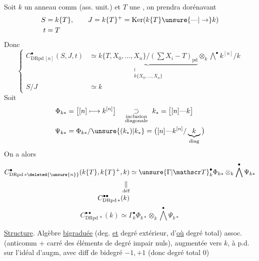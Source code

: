  Soit $k$ un anneau comm (ass. unit.) et $T$ une , on prendra dorénavant
\[
\begin{aligned}
S&=k\{T\},\qquad J=k\{T\}^{+}=\operatorname{Ker}(k\{T\}\unsure{\text{---}|\to} k)\\
t&=T
\end{aligned}
\]
Donc
\[
\left\{\begin{aligned}
C^\bullet_{\mathrm{DRpd}\,[n]}(S,J,t)&\simeq
\underbrace{k\{T,X_0,\ldots,X_n\}/(\textstyle\sum X_i-T)_{\mathrm{pd}}}_{\substack{\wr\\ k\{X_0,\ldots,X_n\}}}
\otimes_k\bigwedge^{\bullet}k^{[n]}/k\\
S/J&\simeq k
\end{aligned}\right.
\]
Soit
\[
\begin{aligned}
\Phi_{k\ast}&=\big[[n]\longmapsto k^{[n]}\big]\quad\underset{\substack{\text{inclusion}\\\text{diagonale}}}{\supset}\ k_\ast=\big[[n]\text{---}k\big]\\
\Psi_{k\ast}&=\Phi_{k\ast}/\unsure{(k_\ast)|k_\ast}=\big([n]\text{---}k^{[n]}/\underbrace{k}_{\mathrm{diag}}\big)
\end{aligned}
\]
On a alors
\[
\begin{aligned}
C^\bullet_{\mathrm{DRpd}\,\ast\deleted{\unsure{n}}}(k\{T\},k\{T\}^{+},k)&\simeq\unsure{\Gamma|\mathscr T}^{\bullet}_{k}\Phi_{k\ast}\otimes_k\bigwedge^\bullet\Psi_{k\ast}\\
\underset{\text{déf}}{\Vert}&\\[-2pt]
C^{\bullet\bullet}_{\mathrm{DRpd}\,\ast}(k)&
\end{aligned}
\]
\[
\boxed{C^{\bullet\bullet}_{\mathrm{DRpd}\,\ast}(k)\simeq\Gamma^\bullet_k\Phi_{k\ast}\otimes_k\bigwedge^\bullet\Psi_{k\ast}}
\]

\uline{Structure}. Algèbre  \uline{bigraduée} (deg.  \uline{et} degré extérieur, d'\uline{où} degré total)  assoc.  (anticomm + carré des éléments de degré impair nuls), augmentée vers $k$, à p.d. sur l'idéal d'augm, avec diff de bidegré $-1,+1$ (donc degré total 0) 

